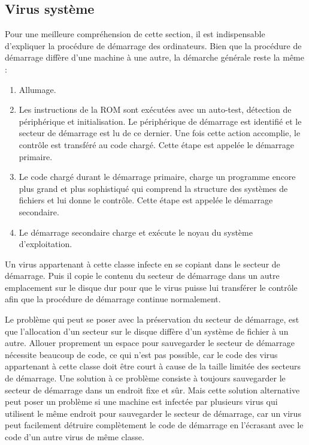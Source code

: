     \subsection{Virus système}
    Pour une meilleure compréhension de cette section, il est indispensable d'expliquer la procédure 
    de démarrage des ordinateurs. Bien que la procédure de démarrage diffère d'une machine à une autre, 
    la démarche générale reste la même : \cite{virus} %
    \begin{enumerate}
        \item Allumage. %
        \item Les instructions de la ROM sont exécutées  avec un auto-test, détection de périphérique et 
            initialisation. Le périphérique de démarrage est identifié et le secteur de démarrage est 
            lu de ce dernier. Une fois cette action accomplie, le contrôle est transféré au code chargé. 
            Cette étape est appelée le démarrage primaire. %
        \item Le code chargé durant le démarrage primaire, charge un programme encore plus grand et plus sophistiqué 
            qui comprend la structure des systèmes de fichiers et lui donne le contrôle. Cette étape est appelée
            le démarrage secondaire. %
        \item Le démarrage secondaire charge et exécute le noyau du système d'exploitation. %
    \end{enumerate}
    
    Un virus appartenant à cette classe infecte en se copiant dans le secteur de démarrage. Puis il copie le contenu du secteur de démarrage dans un autre emplacement sur le disque dur  pour que le virus 
    puisse lui transférer le contrôle afin que la  procédure de démarrage continue normalement.
    \cite{virus} %

    Le problème qui peut se poser avec la préservation du secteur de démarrage, est que l'allocation d'un secteur 
    sur le disque diffère d'un système de fichier à un autre. Allouer proprement un espace pour sauvegarder 
    le secteur de démarrage nécessite beaucoup de code, ce qui n'est pas possible, car le code des virus
    appartenant à cette classe doit être court à cause de la taille limitée des secteurs de démarrage.
    Une solution à ce problème consiste à toujours sauvegarder le secteur de démarrage dans un endroit fixe et sûr.
    Mais cette solution alternative peut poser un problème si une machine est infectée par plusieurs virus qui utilisent
    le même endroit pour sauvegarder le secteur de démarrage, car un virus peut facilement détruire complètement 
    le code de démarrage en l'écrasant avec le code d'un autre virus de même classe. \cite{virus} %

